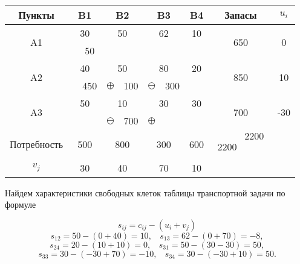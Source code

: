 \documentclass[a4paper,12pt]{article}
\begin{document}
\begin{center}
	\begin{tabular}{|c|c|c|c|c|c|c|c|c|cc}
		\hline
		Пункты & \multicolumn{2}{c|}{B1} & \multicolumn{2}{c|}{B2} & \multicolumn{2}{c|}{B3} & \multicolumn{2}{c|}{B4} & \multicolumn{1}{c|}{Запасы} & \multicolumn{1}{c|}{$u_i$} \\ \hline
		\multirow{2}{*}{A1} & \multicolumn{2}{c|}{30} & \multicolumn{2}{c|}{50} & \multicolumn{2}{c|}{62} & \multicolumn{2}{c|}{10} & \multicolumn{1}{c|}{\multirow{2}{*}{650}} & \multicolumn{1}{c|}{\multirow{2}{*}{0}} \\ \cline{2-9}
		&  & 50 &  &  &  &  &  &  & \multicolumn{1}{c|}{} & \multicolumn{1}{c|}{} \\ \hline
		\multirow{2}{*}{A2} & \multicolumn{2}{c|}{40} & \multicolumn{2}{c|}{50} & \multicolumn{2}{c|}{80} & \multicolumn{2}{c|}{20} & \multicolumn{1}{c|}{\multirow{2}{*}{850}} & \multicolumn{1}{c|}{\multirow{2}{*}{10}} \\ \cline{2-9}
		&  & 450 & \textbf{$\oplus$} & 100 & \textbf{$\ominus$} & 300 &  &  & \multicolumn{1}{c|}{} & \multicolumn{1}{c|}{} \\ \hline
		\multirow{2}{*}{A3} & \multicolumn{2}{c|}{50} & \multicolumn{2}{c|}{10} & \multicolumn{2}{c|}{30} & \multicolumn{2}{c|}{30} & \multicolumn{1}{c|}{\multirow{2}{*}{700}} & \multicolumn{1}{c|}{\multirow{2}{*}{-30}} \\ \cline{2-9}
		&  &  & \textbf{$\ominus$} & 700 & \textbf{$\oplus$} &  &  &  & \multicolumn{1}{c|}{} & \multicolumn{1}{c|}{} \\ \hline
		Потребность & \multicolumn{2}{c|}{500} & \multicolumn{2}{c|}{800} & \multicolumn{2}{c|}{300} & \multicolumn{2}{c|}{600} & \multicolumn{1}{c|}{$\begin{matrix}
				& 2200 \\
				2200 & \\
			\end{matrix}$} &  \\ \cline{1-10}
		$v_j$ & \multicolumn{2}{c|}{30} & \multicolumn{2}{c|}{40} & \multicolumn{2}{c|}{70} & \multicolumn{2}{c|}{10} &  &  \\ \cline{1-9}
	\end{tabular}
\end{center}

Найдем характеристики свободных клеток таблицы транспортной задачи по формуле

\[
	s_{ij} = c_{ij} - (u_i + v_j) 
\]
\[
	s_{12} = 50 - (0 + 40) = 10, \ \ \ \ s_{13} = 62 - (0 + 70) = -8,
\]
\[
	s_{24} = 20 - (10 + 10) = 0, \ \ \ \ s_{31} = 50 - (30 - 30) = 50,
\]
\[
	s_{33} = 30 - (-30 + 70) = -10, \ \ \ \ s_{34} = 30 - (-30 + 10) = 50.
\]
\end{document}
